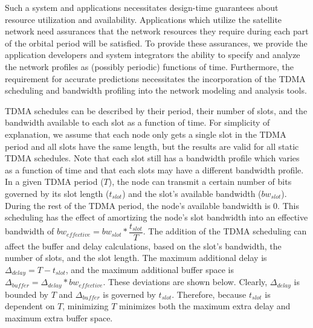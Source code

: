 Such a system and applications necessitates design-time guarantees
about resource utilization and availability.  Applications which
utilize the satellite network need assurances that the network
resources they require during each part of the orbital period will be
satisfied.  To provide these assurances, we provide the application
developers and system integrators the ability to specify and analyze
the network profiles as (possibly periodic) functions of time.
Furthermore, the requirement for accurate predictions necessitates the
incorporation of the TDMA scheduling and bandwidth profiling into the
network modeling and analysis tools.

TDMA schedules can be described by their period, their number of
slots, and the bandwidth available to each slot as a function of time.
For simplicity of explanation, we assume that each node only gets a
single slot in the TDMA period and all slots have the same length, but
the results are valid for all static TDMA schedules.  Note that each
slot still has a bandwidth profile which varies as a function of time
and that each slots may have a different bandwidth profile.  In a
given TDMA period ($T$), the node can transmit a certain number of
bits governed by its slot length ($t_{slot}$) and the slot's available
bandwidth ($bw_{slot}$).  During the rest of the TDMA period, the
node's available bandwidth is $0$.  This scheduling has the effect of
amortizing the node's slot bandwidth into an effective bandwidth of
$bw_{effective} = bw_{slot} * \dfrac{t_{slot}}{T}$.  The addition of
the TDMA scheduling can affect the buffer and delay calculations,
based on the slot's bandwidth, the number of slots, and the slot
length.  The maximum additional delay is $\Delta_{delay} = T -
t_{slot}$, and the maximum additional buffer space is $\Delta_{buffer}
= \Delta_{delay} * bw_{effective}$.  These deviations are shown below.
Clearly, $\Delta_{delay}$ is bounded by $T$ and $\Delta_{buffer}$ is
governed by $t_{slot}$.  Therefore, because $t_{slot}$ is dependent on
$T$, minimizing $T$ minimizes both the maximum extra delay and maximum
extra buffer space.

